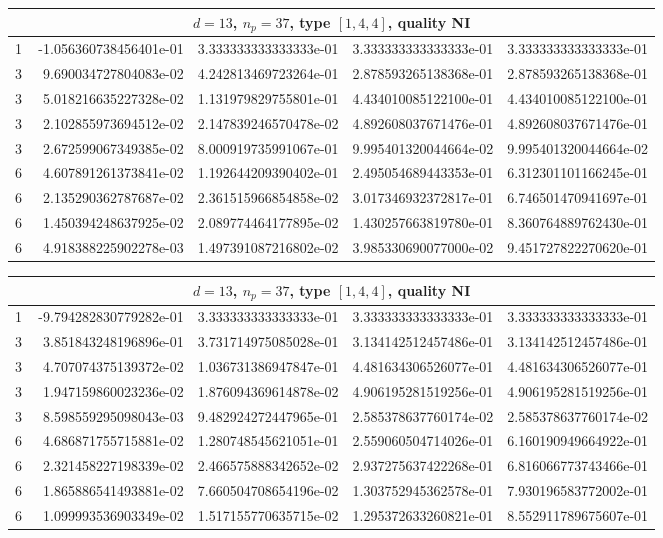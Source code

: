 \documentclass{article}
\begin{document}
\begin{center}
\begin{tabular}{rrrrr}
\multicolumn{5}{c}{\rmfamily $d=13$, $n_p=37$, type $[1,4,4]$, quality NI}\\
\toprule
1 & -1.056360738456401e-01 & 3.333333333333333e-01 & 3.333333333333333e-01 & 3.333333333333333e-01\\
3 & ~9.690034727804083e-02 & 4.242813469723264e-01 & 2.878593265138368e-01 & 2.878593265138368e-01\\
3 & ~5.018216635227328e-02 & 1.131979829755801e-01 & 4.434010085122100e-01 & 4.434010085122100e-01\\
3 & ~2.102855973694512e-02 & 2.147839246570478e-02 & 4.892608037671476e-01 & 4.892608037671476e-01\\
3 & ~2.672599067349385e-02 & 8.000919735991067e-01 & 9.995401320044664e-02 & 9.995401320044664e-02\\
6 & ~4.607891261373841e-02 & 1.192644209390402e-01 & 2.495054689443353e-01 & 6.312301101166245e-01\\
6 & ~2.135290362787687e-02 & 2.361515966854858e-02 & 3.017346932372817e-01 & 6.746501470941697e-01\\
6 & ~1.450394248637925e-02 & 2.089774464177895e-02 & 1.430257663819780e-01 & 8.360764889762430e-01\\
6 & ~4.918388225902278e-03 & 1.497391087216802e-02 & 3.985330690077000e-02 & 9.451727822270620e-01\\
\bottomrule
\end{tabular}
\bigskip

\begin{tabular}{rrrrr}
\multicolumn{5}{c}{\rmfamily $d=13$, $n_p=37$, type $[1,4,4]$, quality NI}\\
\toprule
1 & -9.794282830779282e-01 & 3.333333333333333e-01 & 3.333333333333333e-01 & 3.333333333333333e-01\\
3 & ~3.851843248196896e-01 & 3.731714975085028e-01 & 3.134142512457486e-01 & 3.134142512457486e-01\\
3 & ~4.707074375139372e-02 & 1.036731386947847e-01 & 4.481634306526077e-01 & 4.481634306526077e-01\\
3 & ~1.947159860023236e-02 & 1.876094369614878e-02 & 4.906195281519256e-01 & 4.906195281519256e-01\\
3 & ~8.598559295098043e-03 & 9.482924272447965e-01 & 2.585378637760174e-02 & 2.585378637760174e-02\\
6 & ~4.686871755715881e-02 & 1.280748545621051e-01 & 2.559060504714026e-01 & 6.160190949664922e-01\\
6 & ~2.321458227198339e-02 & 2.466575888342652e-02 & 2.937275637422268e-01 & 6.816066773743466e-01\\
6 & ~1.865886541493881e-02 & 7.660504708654196e-02 & 1.303752945362578e-01 & 7.930196583772002e-01\\
6 & ~1.099993536903349e-02 & 1.517155770635715e-02 & 1.295372633260821e-01 & 8.552911789675607e-01\\
\bottomrule
\end{tabular}
\bigskip


\end{center}
\end{document}

